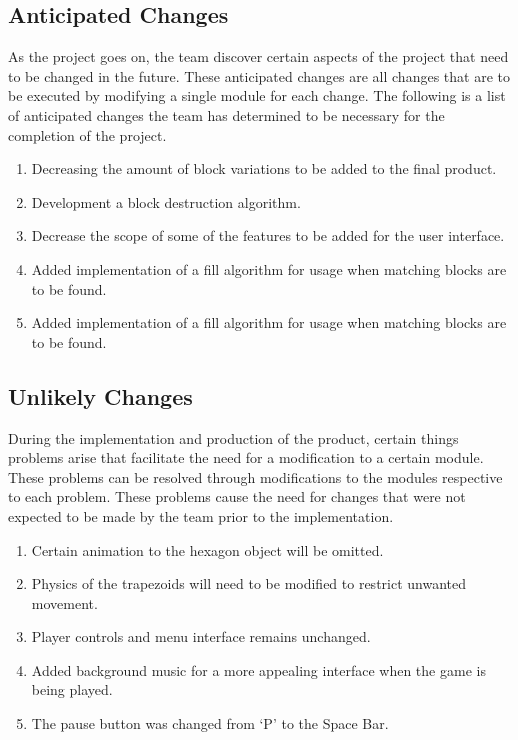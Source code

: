 \documentclass[12pt, titlepage]{article}
\begin{document}
\subsection{Anticipated Changes}
As the project goes on, the team discover certain aspects of the project that need to be changed in the future. These anticipated changes are all changes that are to be executed by modifying a single module for each change. The following is a list of anticipated changes the team has determined to be necessary for the completion of the project.

\begin{enumerate}[label=\textbf{AC\arabic*:}]
\item Decreasing the amount of block variations to be added to the final product.
\item Development a block destruction algorithm.
\item Decrease the scope of some of the features to be added for the user interface.
\item Added implementation of a fill algorithm for usage when matching blocks are to be found.
\item Added implementation of a fill algorithm for usage when matching blocks are to be found.
\end{enumerate}

\subsection{Unlikely Changes}
During the implementation and production of the product, certain things problems arise that facilitate the need for a modification to a certain module. These problems can be resolved through modifications to the modules respective to each problem. These problems cause the need for changes that were not expected to be made by the team prior to the implementation.

\begin{enumerate}[label=\textbf{UC\arabic*:}]
\item Certain animation to the hexagon object will be omitted.
\item Physics of the trapezoids will need to be modified to restrict unwanted movement.
\item Player controls and menu interface remains unchanged.
\item Added background music for a more appealing interface when the game is being played.
\item The pause button was changed from ‘P’ to the Space Bar.
\end{enumerate}
\end{document}
